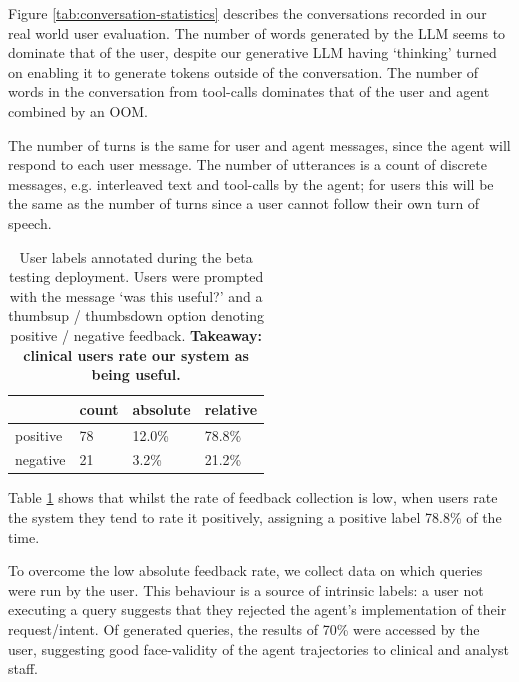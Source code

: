 \documentclass[11pt]{article}
\begin{document}
Figure \ref{tab:conversation-statistics} describes the conversations recorded in our real world user evaluation.
The number of words generated by the LLM seems to dominate that of the user, despite our generative LLM having `thinking' turned on enabling it to generate tokens outside of the conversation.
The number of words in the conversation from tool-calls dominates that of the user and agent combined by an OOM.

The number of turns is the same for user and agent messages, since the agent will respond to each user message.
The number of utterances is a count of discrete messages, e.g. interleaved text and tool-calls by the agent; for users this will be the same as the number of turns since a user cannot follow their own turn of speech.

\begin{table}[ht]
\centering
\begin{tabular}{|l|l|l|l|}
\hline
	            & count & absolute  	&  relative \\	
\hline
	positive 	& 78	& 12.0\%		& 78.8\%	\\
\hline
	negative 	& 21 	& 3.2\%      	& 21.2\%\\
\hline	
\end{tabular}
\caption{
	User labels annotated during the beta testing deployment.
	Users were prompted with the message `was this useful?' and a thumbsup / thumbsdown option denoting positive / negative feedback.
    \textbf{Takeaway: clinical users rate our system as being useful.}
}
\label{tab:user-feedback}
\end{table}


Table \ref{tab:user-feedback} shows that whilst the rate of feedback collection is low, when users rate the system they tend to rate it positively, assigning a positive label 78.8\% of the time.

To overcome the low absolute feedback rate, we collect data on which queries were run by the user.
This behaviour is a source of intrinsic labels: a user not executing a query suggests that they rejected the agent's implementation of their request/intent.
Of generated queries, the results of 70\% were accessed by the user, suggesting good face-validity of the agent trajectories to clinical and analyst staff.
\end{document}
